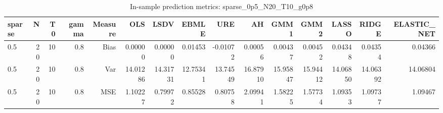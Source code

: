 \begin{table}[!htbp]\centering
\caption{In-sample prediction metrics: sparse_0p5_N20_T10_g0p8}
\label{tab:table2_sparse_0p5_N20_T10_g0p8}
\begin{tabular}{lrrrrrrrrrrrrrr}
\hline
sparse & N & T0 & gamma & Measure & OLS & LSDV & EBMLE & URE & AH & GMM1 & GMM2 & LASSO & RIDGE & ELASTIC_NET \\
\hline
0.5 & 20 & 10 & 0.8 & Bias & 0.00000 & 0.00000 & 0.01453 & -0.01072 & 0.00056 & 0.00437 & 0.00452 & 0.04348 & 0.04354 & 0.04366 \\
0.5 & 20 & 10 & 0.8 & Var & 14.01286 & 14.31731 & 12.75341 & 13.74549 & 16.87910 & 15.95847 & 15.94412 & 14.06850 & 14.06392 & 14.06804 \\
0.5 & 20 & 10 & 0.8 & MSE & 1.10227 & 0.79972 & 0.85528 & 0.80758 & 2.09941 & 1.58225 & 1.57734 & 1.09353 & 1.09737 & 1.09467 \\
\hline
\end{tabular}
\end{table}

